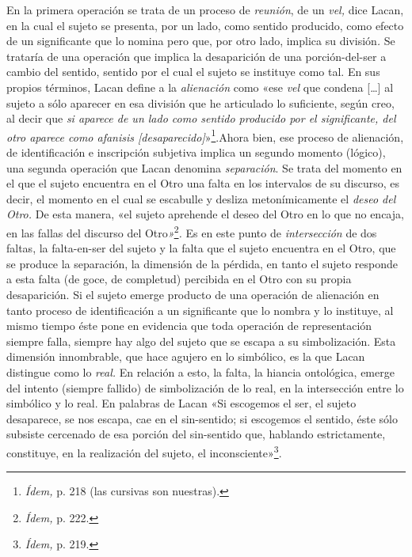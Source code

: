 En la primera operación se trata de un proceso de \emph{reunión}, de un \emph{vel,} dice Lacan, en la cual el sujeto se presenta, por un lado, como sentido producido, como efecto de un significante que lo nomina pero que, por otro lado, implica su división\emph{.} Se trataría de una operación que implica la desaparición de una porción-del-ser a cambio del sentido, sentido por el cual el sujeto se instituye como tal. En sus propios términos, Lacan define a la \emph{alienación} como «ese \emph{vel} que condena {[}\ldots{]} al sujeto a sólo aparecer en esa división que he articulado lo suficiente, según creo, al decir que \emph{si aparece de un lado como sentido producido por el significante, del otro aparece como afanisis {[}desaparecido{]}}»\footnote{\emph{Ídem,} p. 218 (las cursivas son nuestras).}.Ahora bien, ese proceso de alienación, de identificación e inscripción subjetiva implica un segundo momento (lógico), una segunda operación que Lacan denomina \emph{separación}. Se trata del momento en el que el sujeto encuentra en el Otro una falta en los intervalos de su discurso, es decir, el momento en el cual se escabulle y desliza metonímicamente el \emph{deseo del Otro.} De esta manera, «el sujeto aprehende el deseo del Otro en lo que no encaja, en las fallas del discurso del Otro\emph{»}\footnote{\emph{Ídem,} p. 222.}\emph{.} Es en este punto de \emph{intersección} de dos faltas, la falta-en-ser del sujeto y la falta que el sujeto encuentra en el Otro, que se produce la separación, la dimensión de la pérdida, en tanto el sujeto responde a esta falta (de goce, de completud) percibida en el Otro con su propia desaparición. Si el sujeto emerge producto de una operación de alienación en tanto proceso de identificación a un significante que lo nombra y lo instituye, al mismo tiempo éste pone en evidencia que toda operación de representación siempre falla, siempre hay algo del sujeto que se escapa a su simbolización. Esta dimensión innombrable, que hace agujero en lo simbólico, es la que Lacan distingue como lo \emph{real.} En relación a esto, la falta, la hiancia ontológica, emerge del intento (siempre fallido) de simbolización de lo real, en la intersección entre lo simbólico y lo real. En palabras de Lacan «Si escogemos el ser, el sujeto desaparece, se nos escapa, cae en el sin-sentido; si escogemos el sentido, éste sólo subsiste cercenado de esa porción del sin-sentido que, hablando estrictamente, constituye, en la realización del sujeto, el inconsciente»\footnote{\emph{Ídem,} p. 219.}.

